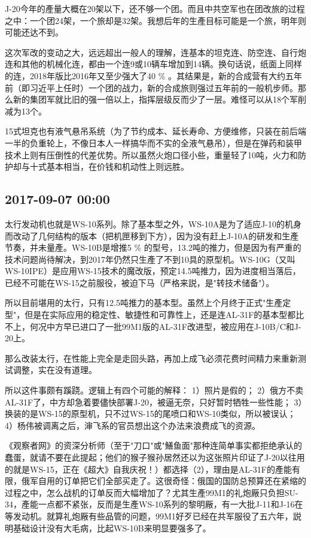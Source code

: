 \documentclass[twocolumn]{ctexart}
\begin{document}
J-20今年的產量大概在20架以下，还不够一个团。而且中共空军也在团改旅的过程之中：一个团24架，一个旅却是32架。我想后年的生產目标可能是一个旅，明年则可能还达不到。

这次军改的变动之大，远远超出一般人的理解，连基本的坦克连、防空连、自行炮连和其他的机械化连，都由一个连9或10辆车增加到14辆。换句话说，纸面上同样的连，2018年版比2016年又至少强大了40 \% 。其结果是，新的合成营有大约五年前（即习近平上任时）一个团的战力，新的合成旅则强过五年前的一般机步师。那么新的集团军就比旧的强一倍以上，指挥层级反而少了一层。难怪可以从18个军削减为13个。

15式坦克也有液气悬吊系统（为了节约成本、延长寿命、方便维修，只装在前后端一半的负重轮上，不像日本人一样搞华而不实的全液气悬吊），但是在弹药和装甲技术上则有压倒性的代差优势。所以虽然火炮口径小些，重量轻了10吨，火力和防护却与十式基本相当，在价钱和机动性上则远胜。\subsection*{2017-09-07 00:00}
太行发动机也就是WS-10系列。除了基本型之外，WS-10A是为了适应J-10的机身而改动了几何结构的版本（把机匣移到下方），因为没有赶上J-10A的研发和生產节奏，并未量產。WS-10B是增推5 \% 的型号，13.2吨的推力，但是因为有严重的技术问题尚待解决，到2017年仍然只生產了不到10具的原型机。WS-10G（又叫WS-10IPE）是应用WS-15技术的魔改版，预定14.5吨推力，因为进度相当落后，已经不可能在WS-15之前服役，被迫下马（严格来説，是"转技术储备"）。

所以目前堪用的太行，只有12.5吨推力的基本型。虽然上个月终于正式"生產定型"，但是在实际应用的稳定性、敏捷性和可靠性上，还是连AL-31F的基本型都比不上，何况中方早已进口了一批99M1版的AL-31F改进型，被应用在J-10B/C和J-20上。

那么改装太行，在性能上完全是走回头路，再加上成飞必须花费时间精力来重新测试调整，实在没有道理。

所以这件事颇有蹊跷。逻辑上有四个可能的解释：
1）照片是假的；
2）俄方不卖AL-31F了，中方却急着要儘快部署J-20，被逼无奈，只好暂时牺牲一些性能；
3）换装的是WS-15的原型机，只不过WS-15的尾喷口和WS-10类似，所以被误认；
4）杨伟被调离之后，渖飞系的官员想出这个办法来浪费成飞的资源。

《观察者网》的资深分析师（至于"刀口"或"鱔鱼面"那种连简单事实都拒绝承认的蠢蛋，就请不要在此提起；他们的猴子猴孙居然还以为这张照片印证了J-20以往用的就是WS-15，正在《超大》自我庆祝！）都选择（2），理由是AL-31F的產能有限，俄军自用的订单把它们全部买走了。这很奇怪：俄国的国防总预算还在紧缩的过程之中，怎么战机的订单反而大幅增加了？尤其生產99M1的礼炮厰只负担SU-34，產能一点都不紧张，反而是生產WS-10系列的黎明厰，有一大批J-11和J-16在等发动机。就算礼炮厰有些品管的问题，99M1好歹已经在共军服役了五六年，説明基础设计没有大毛病，比起WS-10B来明显要强多了。
\end{document}
